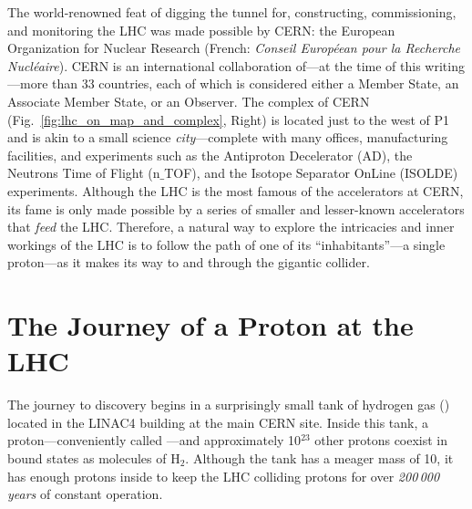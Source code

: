 The world-renowned feat of digging the tunnel for, constructing, commissioning, and monitoring the LHC was made possible by CERN:
the European Organization for Nuclear Research (French: \emph{Conseil Européean pour la Recherche Nucléaire}).
CERN is an international collaboration of---at the time of this writing---more than 33 countries,
each of which is considered either a Member State, an Associate Member State, or an Observer.
The complex of CERN (Fig.~\ref{fig:lhc_on_map_and_complex}, Right) is located just to the west of P1 and is akin to a small science \emph{city}---complete with many offices, manufacturing facilities, and experiments such as the Antiproton Decelerator (AD), the Neutrons Time of Flight (n$\_$TOF), and the Isotope Separator OnLine (ISOLDE) experiments.
Although the LHC is the most famous of the accelerators at CERN, its fame is only made possible by a series of smaller and lesser-known accelerators that \emph{feed} the LHC.
Therefore, a natural way to explore the intricacies and inner workings of the LHC is to follow the path of one of its ``inhabitants''---a single proton---as it makes its way to and through the gigantic collider.

\section{The Journey of a Proton at the LHC}
The journey to discovery begins in a surprisingly small tank of hydrogen gas (\htwo) located in the LINAC4 building at the main CERN site.
Inside this tank, a proton---conveniently called \pname---and approximately
10$^\text{23}$
other protons coexist in bound states as molecules of H$_2$.
Although the tank has a meager mass of 
10\Kg,
it has enough protons inside to keep the LHC colliding protons for over \emph{200\,000 years} of constant operation.

